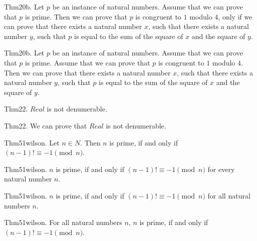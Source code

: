 \documentclass{article}
\begin{document}
Thm20b. Let $p$ be an instance of natural numbers. Assume that we can prove that $p$ is prime. Then we can prove that $p$ is congruent to $1$ modulo $4$, only if we can prove that there exists a natural number $x$, such that there exists a natural number $y$, such that $p$ is equal to the sum of the square of $x$ and the square of $y$.

Thm20b. Let $p$ be an instance of natural numbers. Assume that we can prove that $p$ is prime. Assume that we can prove that $p$ is congruent to $1$ modulo $4$. Then we can prove that there exists a natural number $x$, such that there exists a natural number $y$, such that $p$ is equal to the sum of the square of $x$ and the square of $y$.

Thm22. $Real$ is not denumerable.

Thm22. We can prove that $Real$ is not denumerable.

Thm51wilson. Let $n \in N$. Then $n$ is prime, if and only if $(n - 1)! \equiv - 1 \pmod{ n}$.

Thm51wilson. $n$ is prime, if and only if $(n - 1)! \equiv - 1 \pmod{ n}$ for every natural number $n$.

Thm51wilson. $n$ is prime, if and only if $(n - 1)! \equiv - 1 \pmod{ n}$ for all natural numbers $n$.

Thm51wilson. For all natural numbers $n$, $n$ is prime, if and only if $(n - 1)! \equiv - 1 \pmod{ n}$.
\end{document}
